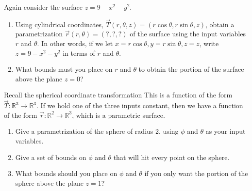 \begin{problem}%
%
%
 Again consider the surface $z=9-x^2-y^2$.
\begin{enumerate}
 \item
Using cylindrical coordinates, $\vec T(r,\theta,z) = (r\cos \theta, r\sin\theta, z)$, obtain a parametrization $\vec r(r,\theta)=(?,?,?)$ of the surface using the input variables $r$ and $\theta$. In other words, if we let $x=r\cos \theta, y=r\sin\theta, z=z$, write $z=9-x^2-y^2$ in terms of $r$ and $\theta$.
 \item What bounds must you place on $r$ and $\theta$ to obtain the portion of the surface above the plane $z=0$?
\end{enumerate}

\end{problem}



\begin{problem}%
%
%
%
Recall the spherical coordinate transformation 
%
%
This is a function of the form $\vec T\colon \mathbb{R}^3\to\mathbb{R}^3$.  If we hold one of the three inputs constant, then we have a function of the form $\vec r\colon \mathbb{R}^2\to\mathbb{R}^3$, which is a parametric surface.
\begin{enumerate}
 \item {}%
Give a parametrization of the sphere of radius 2, using $\phi$ and $\theta$ as your input variables. 
 \item Give a set of bounds on $\phi$ and $\theta$ that will hit every point on the sphere.
 \item What bounds should you place on $\phi$ and $\theta$ if you only want the portion of the sphere above the plane $z=1$?
\end{enumerate}
\end{problem}

